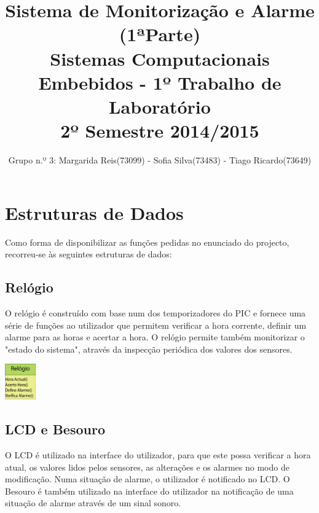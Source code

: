 \documentclass{article}
\begin{document}
	\title{\textbf{Sistema de Monitorização e Alarme (1ªParte)} \\ \large Sistemas Computacionais Embebidos - 1º Trabalho de Laboratório \\ \large 2º Semestre 2014/2015}
	
	\author{Grupo n.º 3: Margarida Reis(73099) - Sofia Silva(73483) - Tiago Ricardo(73649)}
	
	\maketitle	
	
	
	\section{Estruturas de Dados}
	Como forma de disponibilizar as funções pedidas no enunciado do projecto, recorreu-se às seguintes estruturas de dados:
	
	\subsection{Relógio}		
	
		
		O relógio é construído com base num dos temporizadores do PIC e fornece uma série de funções ao utilizador que permitem verificar a hora corrente, definir um alarme para as horas e acertar a hora. O relógio permite também monitorizar o "estado do sistema", através da inspecção periódica dos valores dos sensores.
		
	\begin{center}
		\includegraphics[width=0.10\textwidth]{scereport_01}
	\end{center}
	

	
	
	\subsection{LCD e Besouro}		
	
	O LCD é utilizado na interface do utilizador, para que este possa verificar a hora atual, os valores lidos pelos sensores, as alterações e os alarmes no modo de modificação. Numa situação de alarme, o utilizador é notificado no LCD. O Besouro é também utilizado na interface do utilizador na notificação de uma situação de alarme através de um sinal sonoro. 
	
\end{document}
